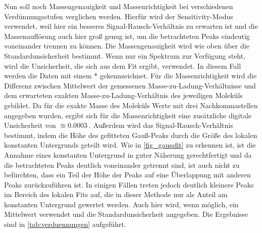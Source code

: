 Nun soll noch Massengenauigkeit und Massenrichtigkeit bei verschiedenen Verdünnungsstufen verglichen werden.
Hierfür wird der Sensitivity-Modus verwendet, weil hier ein besseres Signal-Rausch-Verhältnis zu erwarten ist und die Massenauflösung auch hier groß genug ist, um die betrachteten Peaks eindeutig voneinander trennen zu können.
Die Massengenauigkeit wird wie oben über die Standardunsicherheit bestimmt.
Wenn nur ein Spektrum zur Verfügung steht, wird die Unsicherheit, die sich aus dem Fit ergibt, verwendet.
In diesem Fall werden die Daten mit einem $*$ gekennzeichnet.
Für die Massenrichtigkeit wird die Differenz zwischen Mittelwert der gemessenen Masse-zu-Ladung-Verhältnisse und dem erwarteten exakten Masse-zu-Ladung-Verhältnis des jeweiligen Moleküls gebildet.
Da für die exakte Masse des Moleküls Werte mit drei Nachkommastellen angegeben wurden, ergibt sich für die Massenrichtigkeit eine zusätzliche digitale Unsicherheit von $\approxeq \SI{0.0003}{}$.
Außerdem wird das Signal-Rausch-Verhältnis bestimmt, indem die Höhe des gefitteten Gauß-Peaks durch die Größe des lokalen konstanten Untergrunds geteilt wird.
Wie in \cref{fig_gaussfit} zu erkennen ist, ist die Annahme eines konstanten Untergrund in guter Näherung gerechtfertigt und da die betrachteten Peaks deutlich voneinander getrennt sind, ist auch nicht zu befürchten, dass ein Teil der Höhe der Peaks auf eine Überlappung mit anderen Peaks zurückzuführen ist.
In einigen Fällen treten jedoch deutlich kleinere Peaks im Bereich des lokalen Fits auf, die in dieser Methode nur als Anteil am konstanten Untergrund gewertet werden.
Auch hier wird, wenn möglich, ein Mittelwert verwendet und die Standardunsicherheit angegeben.
Die Ergebnisse sind in \cref{tab:verduennungen} aufgeführt.

